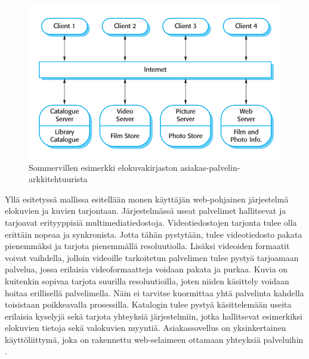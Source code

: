 \documentclass[utf8]{gradu3}
\begin{document}
\begin{figure}[h]
\centering
\includegraphics[scale=0.85]{clientserver.png}
\caption{Sommervillen esimerkki elokuvakirjaston asiakas-palvelin-arkkitehtuurista \parencite[s.162]{Sommerville}}
\end{figure}

Yllä esitetyssä mallissa esitellään monen käyttäjän web-pohjainen järjestelmä elokuvien ja kuvien tarjontaan. Järjestelmässä useat palvelimet hallitsevat ja tarjoavat erityyppisiä multimediatiedostoja. Videotiedostojen tarjonta tulee olla erittäin nopeaa ja synkronista. Jotta tähän pystytään, tulee videotiedosto pakata pienemmäksi ja tarjota pienemmällä resoluutiolla. Lisäksi videoiden formaatit voivat vaihdella, jolloin videoille tarkoitetun palvelimen tulee pystyä tarjoamaan palvelua, jossa erilaisia videoformaatteja voidaan pakata ja purkaa. Kuvia on kuitenkin sopivaa tarjota suurilla resoluutioilla, joten niiden käsittely voidaan hoitaa erillisellä palvelimella. Näin ei tarvitse kuormittaa yhtä palvelinta kahdella toisistaan poikkeavalla prosessilla. Katalogin tulee pystyä käsittelemään useita erilaisia kyselyjä sekä tarjota yhteyksiä järjestelmiin, jotka hallitsevat esimerkiksi elokuvien tietoja sekä valokuvien myyntiä. Asiakassovellus on yksinkertainen käyttöliittymä, joka on rakennettu web-selaimeen ottamaan yhteyksiä palveluihin \parencite[s. 163]{Sommerville}. 
\end{document}
